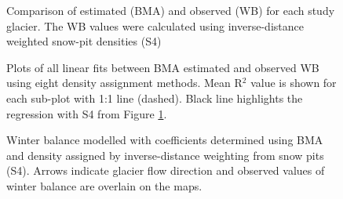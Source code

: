 \documentclass{sfuthesis}
\newcommand{\swedots}{Arrows indicate glacier flow direction and observed values of winter balance are overlain on the maps. }
\begin{document}
{\begin{figure}[H]
	\caption[Comparison of estimated (BMA) and observed (WB) for each study glacier]{Comparison of estimated (BMA) and observed (WB) for each study glacier. The WB values were calculated using inverse-distance weighted snow-pit densities (S4)}
	\label{fig:BMSfit_opt8}
\end{figure}

\begin{figure}[H]
	\caption[Plots of all linear fits between BMA estimated and observed WB using eight density assignment methods]{Plots of all linear fits between BMA estimated and observed WB using eight density assignment methods. Mean R$^2$ value is shown for each sub-plot with 1:1 line (dashed). Black line highlights the regression with S4 from Figure \ref{fig:BMSfit_opt8}. }
	\label{fig:BMSfit_allLines}
\end{figure}

\begin{figure}[H]
	\caption[Winter balance modelled with coefficients determined using BMA and density assigned by inverse-distance weighting from snow pits (S4)]{Winter balance modelled with coefficients determined using BMA and density assigned by inverse-distance weighting from snow pits (S4). \swedots}
	\label{fig:BMSmodelledSWE}
\end{figure}

}
\end{document}
